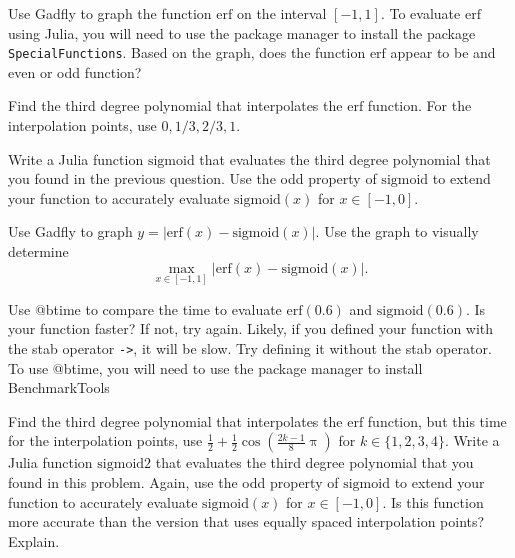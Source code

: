 \documentclass[12pt,fleqn]{exam}
\newcommand{\sigmoid}{\mathrm{sigmoid}}
\newcommand{\erf}{\mathrm{erf}}
\begin{document}
\begin{questions}

\question [10] Use Gadfly to graph the function $\erf$ on the interval $[-1,1]$.  To evaluate $\erf$ using Julia, you 
will need to use the package manager to install the package \texttt{SpecialFunctions}. Based on the graph, does 
the function $\erf$ appear to be and even or odd function?

\question [10] Find the third degree polynomial that interpolates the $\erf$ function. For the interpolation points,
use $0,1/3, 2/3, 1$.

\question [10] Write a Julia function $\sigmoid$ that evaluates the third degree polynomial that you found in the previous 
question. Use the odd property of $\sigmoid$ to extend your function to accurately evaluate $\sigmoid(x)$ for 
$x \in [-1,0]$. 

\question [10] Use Gadfly to graph $y = |\erf(x) - \sigmoid(x)|$. Use the graph to visually determine 
\begin{equation}
   \max\limits_{x \in [-1,1]}  |\erf(x) - \sigmoid(x)|.
\end{equation}

\question [10] Use @btime to compare the time to evaluate $\erf(0.6)$ and $\sigmoid(0.6)$. Is your function faster?
If not, try again. Likely, if you defined your function with the stab operator \texttt{->}, it will be slow. Try defining it without
the stab operator.  To use @btime, you will need to use the package manager to install BenchmarkTools

\question [10] Find the third degree polynomial that interpolates the $\erf$ function, but this time for the interpolation points,
use $\frac{1}{2} + \frac{1}{2} \cos \left (\frac{2 k -1}{8} \uppi \right)$ for $k \in \{1,2,3,4\}$. Write a Julia function $\sigmoid2$ that evaluates the third degree polynomial that you found in this problem. Again, use the odd property of $\sigmoid$ to extend your function to accurately evaluate $\sigmoid(x)$ for 
$x \in [-1,0]$. Is this function more accurate than the version that uses equally spaced interpolation points? Explain.



\end{questions}
\end{document}
